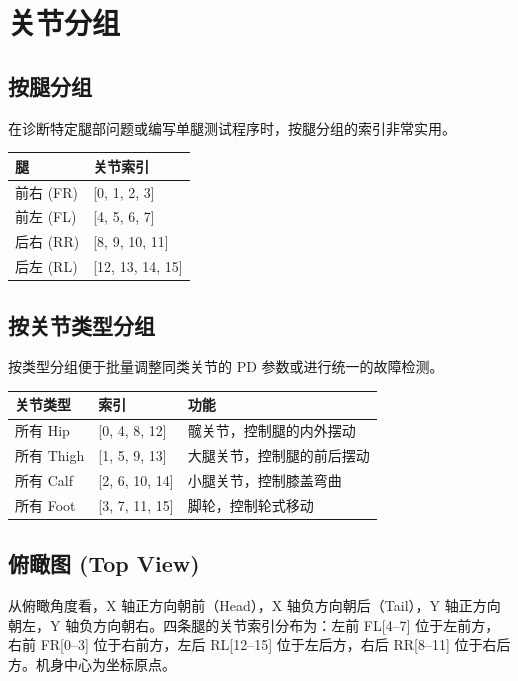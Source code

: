 \documentclass[a4paper,11pt,openany]{book}
\begin{document}
\section{关节分组}

\subsection{按腿分组}

在诊断特定腿部问题或编写单腿测试程序时，按腿分组的索引非常实用。

\begin{longtable}{ll}
\toprule
腿 & 关节索引 \\
\midrule
前右 (FR) & {[}0, 1, 2, 3{]} \\
前左 (FL) & {[}4, 5, 6, 7{]} \\
后右 (RR) & {[}8, 9, 10, 11{]} \\
后左 (RL) & {[}12, 13, 14, 15{]} \\
\bottomrule
\end{longtable}

\subsection{按关节类型分组}

按类型分组便于批量调整同类关节的 PD 参数或进行统一的故障检测。

\begin{longtable}{lll}
\toprule
关节类型 & 索引 & 功能 \\
\midrule
所有 Hip & {[}0, 4, 8, 12{]} & 髋关节，控制腿的内外摆动 \\
所有 Thigh & {[}1, 5, 9, 13{]} & 大腿关节，控制腿的前后摆动 \\
所有 Calf & {[}2, 6, 10, 14{]} & 小腿关节，控制膝盖弯曲 \\
所有 Foot & {[}3, 7, 11, 15{]} & 脚轮，控制轮式移动 \\
\bottomrule
\end{longtable}

\subsection{俯瞰图 (Top View)}

从俯瞰角度看，X 轴正方向朝前（Head），X 轴负方向朝后（Tail），Y 轴正方向朝左，Y 轴负方向朝右。四条腿的关节索引分布为：左前 FL{[}4--7{]} 位于左前方，右前 FR{[}0--3{]} 位于右前方，左后 RL{[}12--15{]} 位于左后方，右后 RR{[}8--11{]} 位于右后方。机身中心为坐标原点。
\end{document}
